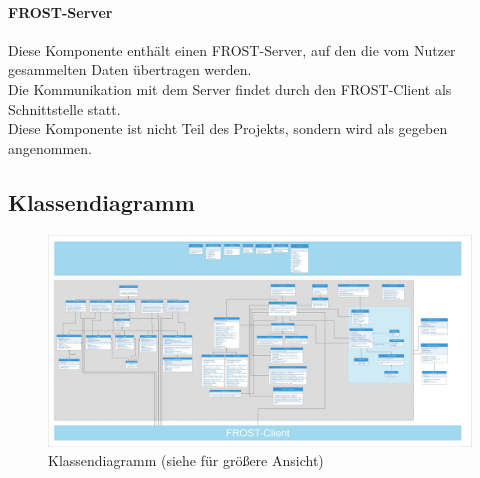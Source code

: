 \paragraph{FROST-Server}
Diese Komponente enthält einen FROST-Server, auf den die vom Nutzer gesammelten Daten übertragen werden.\\
Die Kommunikation mit dem Server findet durch den FROST-Client als Schnittstelle statt.\\
Diese Komponente ist nicht Teil des Projekts, sondern wird als gegeben angenommen.

\clearpage
\subsection{Klassendiagramm}

\begin{figure}[!h]
\centering
\includegraphics[angle =90, scale=0.13]{Klassendiagramm/klassendiagramm.eps}
\caption{Klassendiagramm (siehe  für größere Ansicht)}
\end{figure}